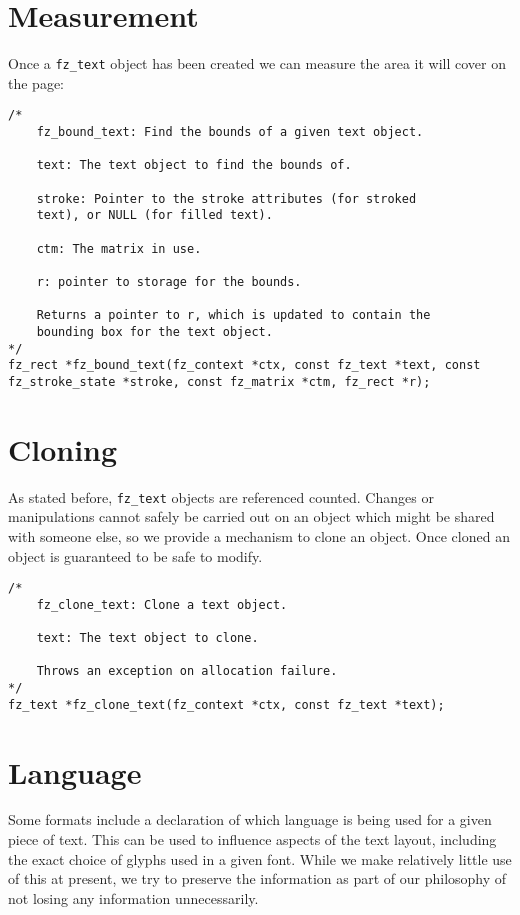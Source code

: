 \documentclass[oneside]{book}
\begin{document}
\section{Measurement}
\label{TextMeasurement}

Once a \texttt{fz\_text} object has been created we can measure the area it will cover on the page:

\begin{lstlisting}
/*
	fz_bound_text: Find the bounds of a given text object.

	text: The text object to find the bounds of.

	stroke: Pointer to the stroke attributes (for stroked
	text), or NULL (for filled text).

	ctm: The matrix in use.

	r: pointer to storage for the bounds.

	Returns a pointer to r, which is updated to contain the
	bounding box for the text object.
*/
fz_rect *fz_bound_text(fz_context *ctx, const fz_text *text, const fz_stroke_state *stroke, const fz_matrix *ctm, fz_rect *r);
\end{lstlisting}

\section{Cloning}
\label{TextCloning}

As stated before, \texttt{fz\_text} objects are referenced counted. Changes or manipulations cannot safely be carried out on an object which might be shared with someone else, so we provide a mechanism to clone an object. Once cloned an object is guaranteed to be safe to modify.

\begin{lstlisting}
/*
	fz_clone_text: Clone a text object.

	text: The text object to clone.

	Throws an exception on allocation failure.
*/
fz_text *fz_clone_text(fz_context *ctx, const fz_text *text);
\end{lstlisting}

\section{Language}
\label{TextLanguage}

Some formats include a declaration of which language is being used for a given piece of text. This can be used to influence aspects of the text layout, including the exact choice of glyphs used in a given font. While we make relatively little use of this at present, we try to preserve the information as part of our philosophy of not losing any information unnecessarily.
\end{document}
